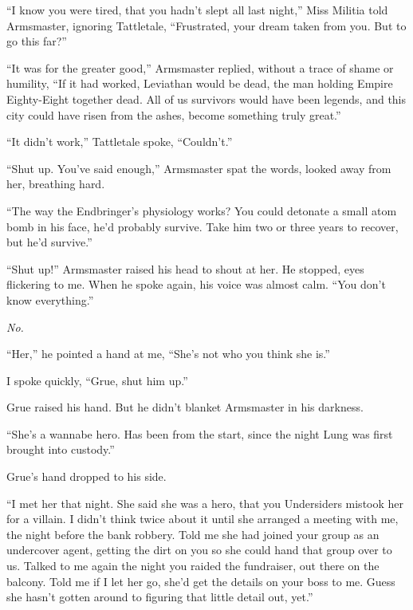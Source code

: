 ``I know you were tired, that you hadn't slept all last night,'' Miss Militia told Armsmaster, ignoring Tattletale, ``Frustrated, your dream taken from you.  But to go this far?''



``It was for the greater good,'' Armsmaster replied, without a trace of shame or humility, ``If it had worked, Leviathan would be dead, the man holding Empire Eighty-Eight together dead.  All of us survivors would have been legends, and this city could have risen from the ashes, become something truly great.''



``It didn't work,'' Tattletale spoke, ``Couldn't.''



``Shut up.  You've said enough,'' Armsmaster spat the words, looked away from her, breathing hard.



``The way the Endbringer's physiology works?  You could detonate a small atom bomb in his face, he'd probably survive.  Take him two or three years to recover, but he'd survive.''



``Shut up!'' Armsmaster raised his head to shout at her.  He stopped, eyes flickering to me.  When he spoke again, his voice was almost calm.  ``You don't know everything.''



\emph{No.}



``Her,'' he pointed a hand at me, ``She's not who you think she is.''



I spoke quickly, ``Grue, shut him up.''



Grue raised his hand.  But he didn't blanket Armsmaster in his darkness.



``She's a wannabe hero.  Has been from the start, since the night Lung was first brought into custody.''



Grue's hand dropped to his side.



``I met her that night.  She said she was a hero, that you Undersiders mistook her for a villain.  I didn't think twice about it until she arranged a meeting with me, the night before the bank robbery.  Told me she had joined your group as an undercover agent, getting the dirt on you so she could hand that group over to us.  Talked to me again the night you raided the fundraiser, out there on the balcony.  Told me if I let her go, she'd get the details on your boss to me.  Guess she hasn't gotten around to figuring that little detail out, yet.''




